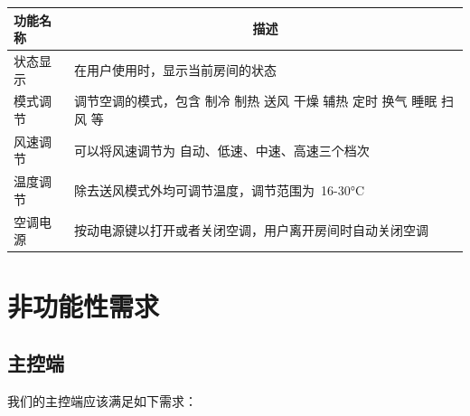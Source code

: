 \documentclass[blue,normal,cn]{elegantnote}
\begin{document}
\begin{center}
	\begin{tabular}{|>{\centering}m{}|m{}|}
		\hline
		\textbf{功能名称} & \multicolumn{1}{c|}{\textbf{描述}}                                   \\
		\hline
		状态显示          & 在用户使用时，显示当前房间的状态                                     \\
		\hline
		模式调节          & 调节空调的模式，包含 制冷 制热 送风 干燥 辅热 定时 换气 睡眠 扫风 等 \\
		\hline
		风速调节          & 可以将风速调节为 自动、低速、中速、高速三个档次                      \\
		\hline
		温度调节          & 除去送风模式外均可调节温度，调节范围为 16-30°C                       \\
		\hline
		空调电源          & 按动电源键以打开或者关闭空调，用户离开房间时自动关闭空调             \\
		\hline
	\end{tabular}
\end{center}

\section{非功能性需求}

\subsection{主控端}
我们的主控端应该满足如下需求：
\end{document}
